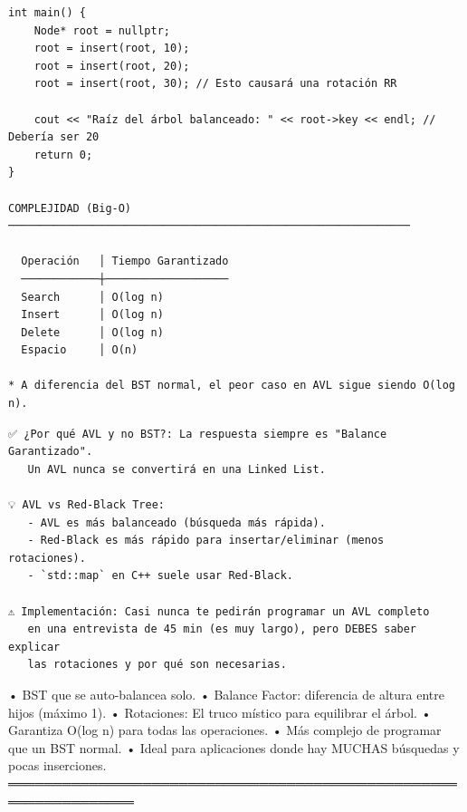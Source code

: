 \begin{lstlisting}
int main() {
    Node* root = nullptr;
    root = insert(root, 10);
    root = insert(root, 20);
    root = insert(root, 30); // Esto causará una rotación RR

    cout << "Raíz del árbol balanceado: " << root->key << endl; // Debería ser 20
    return 0;
}

COMPLEJIDAD (Big-O)
──────────────────────────────────────────────────────────────

  Operación   │ Tiempo Garantizado
  ────────────┼───────────────────
  Search      │ O(log n)
  Insert      │ O(log n)
  Delete      │ O(log n)
  Espacio     │ O(n)

* A diferencia del BST normal, el peor caso en AVL sigue siendo O(log n).
\end{lstlisting}

\begin{lstlisting}
✅ ¿Por qué AVL y no BST?: La respuesta siempre es "Balance Garantizado".
   Un AVL nunca se convertirá en una Linked List.

💡 AVL vs Red-Black Tree: 
   - AVL es más balanceado (búsqueda más rápida).
   - Red-Black es más rápido para insertar/eliminar (menos rotaciones).
   - `std::map` en C++ suele usar Red-Black.

⚠️ Implementación: Casi nunca te pedirán programar un AVL completo 
   en una entrevista de 45 min (es muy largo), pero DEBES saber explicar 
   las rotaciones y por qué son necesarias.
\end{lstlisting}

\begin{dsaresumen}

• BST que se auto-balancea solo.
• Balance Factor: diferencia de altura entre hijos (máximo 1).
• Rotaciones: El truco místico para equilibrar el árbol.
• Garantiza O(log n) para todas las operaciones.
• Más complejo de programar que un BST normal.
• Ideal para aplicaciones donde hay MUCHAS búsquedas y pocas inserciones.
════════════════════════════════════════════════════════════════

\end{dsaresumen}


